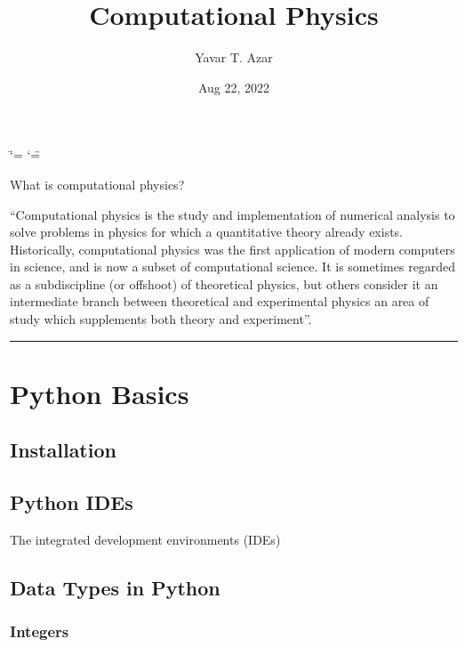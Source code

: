 \documentclass[letterpaper,10pt,english]{sphinxmanual}
\title{Computational Physics}
\date{Aug 22, 2022}
\author{Yavar T.\@{} Azar}
\begin{document}
\ifdefined\shorthandoff
  \ifnum\catcode`\=\string=\active\shorthandoff{=}\fi
  \ifnum\catcode`\"=\active{}\fi
\fi

\pagestyle{empty}
\sphinxmaketitle
\pagestyle{plain}
\sphinxtableofcontents
\pagestyle{normal}
\label{\detokenize{index::doc}}


\sphinxAtStartPar
What is computational physics?

\sphinxAtStartPar
“Computational physics is the study and implementation of numerical analysis to solve problems in physics for which a quantitative theory already exists. Historically, computational physics was the first application of modern computers in science, and is now a subset of computational science. It is sometimes regarded as a subdiscipline (or offshoot) of theoretical physics, but others consider it an intermediate branch between theoretical and experimental physics \sphinxhyphen{} an area of study which supplements both theory and experiment”.  


\bigskip\hrule\bigskip


\sphinxstepscope


\chapter{Python Basics}
\label{\detokenize{Python/Python:python-basics}}\label{\detokenize{Python/Python::doc}}

\section{Installation}
\label{\detokenize{Python/Python:installation}}

\section{Python IDEs}
\label{\detokenize{Python/Python:python-ides}}
\sphinxAtStartPar
The integrated development environments (IDEs)


\section{Data Types in Python}
\label{\detokenize{Python/Python:data-types-in-python}}

\subsection{Integers}
\label{\detokenize{Python/Python:integers}}
\end{document}

